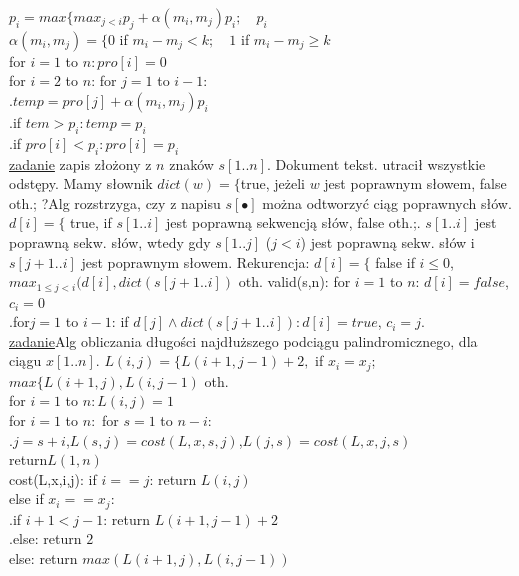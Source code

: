 \documentclass[8pt,a3paper]{article}
\begin{document}
\begin{multicols*}{3}
{	 $p_{i}=max\{ max_{j<i}{p_{j}+\alpha(m_{i},m_{j})p_{i};\quad p_{i}}$ \\
	 $\alpha(m_{i},m_{j}) = \{0$ if $ m_{i}-m_{j}<k; \quad 1$ if $ m_{i}-m_{j} \geq k$\\
	 for $i=1$ to $n: pro[i]=0$\\
	 for $i=2$ to $n$: for $j=1$ to $i-1$: \\
	 .\quad $temp=pro[j]+ \alpha(m_{i},m_{j})p_{i}$ \\
	 .\quad if $tem > p_{i}: temp=p_{i}$\\
	 .\quad if $pro[i]<p_{i}: pro[i]=p_{i}$ \\
	 \underline{zadanie} zapis złożony z $n$ znaków $s[1..n]$. Dokument tekst. utracił wszystkie odstępy. Mamy słownik $dict(w)=\{$true, jeżeli $w$ jest poprawnym słowem, false oth.; ?Alg rozstrzyga, czy z napisu $s[\bullet]$ można odtworzyć ciąg poprawnych słów.\\
	 $d[i]=\{$ true, if $s[1..i]$ jest poprawną sekwencją słów, false oth.;.\quad
	 $s[1..i]$ jest poprawną sekw. słów, wtedy gdy $s[1..j]$ ($j<i$) jest poprawną sekw. słów i $s[j+1..i]$ jest poprawnym słowem. Rekurencja: $d[i]=\{$ false if $i\leq 0$, $max_{1\leq j<i}(d[i], dict(s[j+1..i]) $ oth. \quad valid(s,n): for $i=1$ to $n$: $d[i]=false$, {\color{BrickRed}$c_{i}=0$}\\
	 .\quad for$j=1$ to $i-1$: if $d[j] \wedge dict(s[j+1..i]): d[i]=true$, {\color{BrickRed}$c_{i}=j$}.\\
	 \underline{zadanie}Alg obliczania długości najdłuższego podciągu palindromicznego, dla ciągu $x[1..n]$. $L(i,j)=\{L(i+1,j-1)+2,$ if $x_{i}=x_{j}$;\quad $max\{L(i+1,j),L(i,j-1)$ oth. \\
	 for $i=1$ to $n: L(i,j)=1$\\
	 for $i=1$ to $n:$ for $s=1$ to $n-i$: \\
	 .\quad $j=s+i$,$L(s,j)=cost(L,x,s,j)$,$L(j,s)=cost(L,x,j,s)$\\
	 return$L(1,n)$\\
	 cost(L,x,i,j): if $i==j$: return $L(i,j)$\\
	 else if $x_{i}==x_{j}$: \\
	 .\quad if $i+1<j-1$: return $L(i+1,j-1)+2$\\
	 .\quad else: return $2$\\
	 else: return $max(L(i+1,j),L(i,j-1))$\\
}
\end{multicols*}
\end{document}
